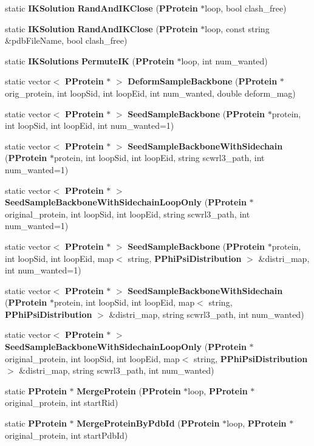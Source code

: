 \begin{CompactItemize}
\item 
static {\bf IKSolution} {\bf Rand\-And\-IKClose} ({\bf PProtein} $\ast$loop, bool clash\_\-free)
\item 
static {\bf IKSolution} {\bf Rand\-And\-IKClose} ({\bf PProtein} $\ast$loop, const string \&pdb\-File\-Name, bool clash\_\-free)
\item 
static {\bf IKSolutions} {\bf Permute\-IK} ({\bf PProtein} $\ast$loop, int num\_\-wanted)
\item 
static vector$<$ {\bf PProtein} $\ast$ $>$ {\bf Deform\-Sample\-Backbone} ({\bf PProtein} $\ast$orig\_\-protein, int loop\-Sid, int loop\-Eid, int num\_\-wanted, double deform\_\-mag)
\item 
static vector$<$ {\bf PProtein} $\ast$ $>$ {\bf Seed\-Sample\-Backbone} ({\bf PProtein} $\ast$protein, int loop\-Sid, int loop\-Eid, int num\_\-wanted=1)
\item 
static vector$<$ {\bf PProtein} $\ast$ $>$ {\bf Seed\-Sample\-Backbone\-With\-Sidechain} ({\bf PProtein} $\ast$protein, int loop\-Sid, int loop\-Eid, string scwrl3\_\-path, int num\_\-wanted=1)
\item 
static vector$<$ {\bf PProtein} $\ast$ $>$ {\bf Seed\-Sample\-Backbone\-With\-Sidechain\-Loop\-Only} ({\bf PProtein} $\ast$original\_\-protein, int loop\-Sid, int loop\-Eid, string scwrl3\_\-path, int num\_\-wanted=1)
\item 
static vector$<$ {\bf PProtein} $\ast$ $>$ {\bf Seed\-Sample\-Backbone} ({\bf PProtein} $\ast$protein, int loop\-Sid, int loop\-Eid, map$<$ string, {\bf PPhi\-Psi\-Distribution} $>$ \&distri\_\-map, int num\_\-wanted=1)
\item 
static vector$<$ {\bf PProtein} $\ast$ $>$ {\bf Seed\-Sample\-Backbone\-With\-Sidechain} ({\bf PProtein} $\ast$protein, int loop\-Sid, int loop\-Eid, map$<$ string, {\bf PPhi\-Psi\-Distribution} $>$ \&distri\_\-map, string scwrl3\_\-path, int num\_\-wanted)
\item 
static vector$<$ {\bf PProtein} $\ast$ $>$ {\bf Seed\-Sample\-Backbone\-With\-Sidechain\-Loop\-Only} ({\bf PProtein} $\ast$original\_\-protein, int loop\-Sid, int loop\-Eid, map$<$ string, {\bf PPhi\-Psi\-Distribution} $>$ \&distri\_\-map, string scwrl3\_\-path, int num\_\-wanted)
\item 
static {\bf PProtein} $\ast$ {\bf Merge\-Protein} ({\bf PProtein} $\ast$loop, {\bf PProtein} $\ast$original\_\-protein, int start\-Rid)
\item 
static {\bf PProtein} $\ast$ {\bf Merge\-Protein\-By\-Pdb\-Id} ({\bf PProtein} $\ast$loop, {\bf PProtein} $\ast$original\_\-protein, int start\-Pdb\-Id)

\end{CompactItemize}
